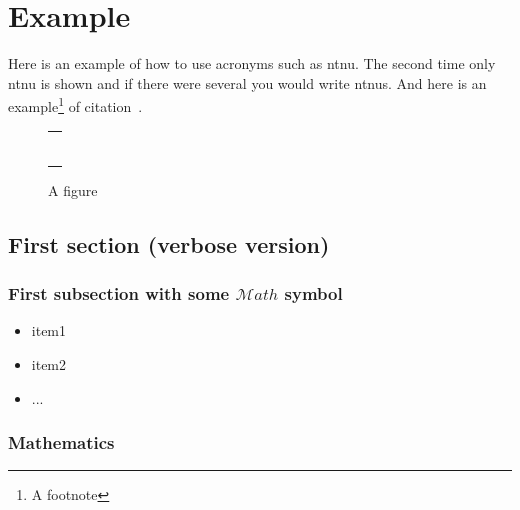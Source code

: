 \chapter{Example}
\label{chp:example} 

Here is an example of how to use acronyms such as \gls{ntnu}. The second time only \gls{ntnu} is shown and if there were several you would write \glspl{ntnu}. And here is an example\footnote{A footnote} of citation~\cite{Author:year:XYZ}. 

\Blindtext[3][1]

\begin{figure}
\centering
\begin{tabular}{@{}c@{}}
\rule{.5\textwidth}{.5\textwidth} \\
\end{tabular}
\caption{\label{fig:example}A figure}
\end{figure}

\section[First section (middling version)(ToC)]{First section (verbose version)%
              }
\label{sec:first_section}

\subsection{First subsection with some \texorpdfstring{$\mathcal{M}ath$}{Math} symbol}\label{sec:first_ssection}

\blindtext
\begin{itemize}
 \item item1
 \item item2
 \item ...
\end{itemize}

\subsection{Mathematics}

